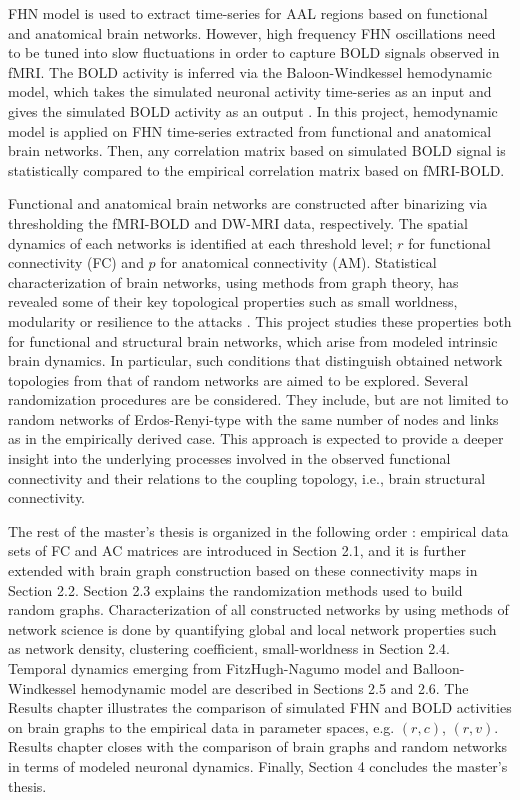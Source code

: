 FHN model is used to extract time-series for AAL regions based on functional and anatomical brain networks. However, high frequency FHN oscillations need to be tuned into slow fluctuations in order to capture BOLD signals observed in fMRI. The BOLD activity is inferred via the Baloon-Windkessel hemodynamic model, which takes the simulated neuronal activity time-series as an input and gives the simulated BOLD activity as an output \citep{FRI00}. In this project, hemodynamic model is applied on FHN time-series extracted from functional and anatomical brain networks. Then, any correlation matrix based on simulated BOLD signal is statistically compared to the empirical correlation matrix based on fMRI-BOLD.      

Functional and anatomical brain networks are constructed after binarizing via thresholding the fMRI-BOLD and DW-MRI data, respectively. The spatial dynamics of each networks is identified at each threshold level; $r$ for functional connectivity (FC) and $p$ for anatomical connectivity (AM). Statistical characterization of brain networks, using methods from graph theory, has revealed some of their key topological properties such as small worldness, modularity or resilience to the attacks \citep{BUL09}. This project studies these properties both for functional and structural brain networks, which arise from modeled intrinsic brain dynamics. In particular, such conditions that distinguish obtained network topologies from that of random networks are aimed to be explored. Several randomization procedures are be considered. They include, but are not limited to random networks of Erdos-Renyi-type with the same number of nodes and links as in the empirically derived case. This approach is expected to provide a deeper insight into the underlying processes involved in the observed functional connectivity and their relations to the coupling topology, i.e., brain structural connectivity.


The rest of the master's thesis is organized in the following order : empirical data sets of FC and AC matrices are introduced in Section 2.1, and it is further extended with brain graph construction based on these connectivity maps in Section 2.2. Section 2.3 explains the randomization methods used to build random graphs. Characterization of all constructed networks by using methods of network science \citep{RUB09, STA10, NEW10, RUB11} is done by quantifying global and local network properties such as network density, clustering coefficient, small-worldness in Section 2.4. Temporal dynamics emerging from FitzHugh-Nagumo model and Balloon-Windkessel hemodynamic model \citep{FRI00} are described in Sections 2.5 and 2.6. The Results chapter illustrates the comparison of simulated FHN and BOLD activities on brain graphs to the empirical data in parameter spaces, e.g. $(r,c)$, $(r,v)$. Results chapter closes with the comparison of brain graphs and random networks in terms of modeled neuronal dynamics. Finally, Section 4 concludes the master's thesis. 

 
 

